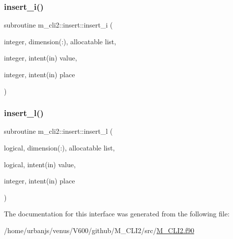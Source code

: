 \subsubsection{\texorpdfstring{insert\+\_\+i()}{insert\_i()}}
{\footnotesize\ttfamily subroutine m\+\_\+cli2\+::insert\+::insert\+\_\+i (\begin{DoxyParamCaption}\item[{integer, dimension(\+:), allocatable}]{list,  }\item[{integer, intent(in)}]{value,  }\item[{integer, intent(in)}]{place }\end{DoxyParamCaption})\hspace{0.3cm}{\ttfamily [private]}}

\mbox{\label{interfacem__cli2_1_1insert_a48dedb7035fb157485c81de9fc245659}} 
\subsubsection{\texorpdfstring{insert\+\_\+l()}{insert\_l()}}
{\footnotesize\ttfamily subroutine m\+\_\+cli2\+::insert\+::insert\+\_\+l (\begin{DoxyParamCaption}\item[{logical, dimension(\+:), allocatable}]{list,  }\item[{logical, intent(in)}]{value,  }\item[{integer, intent(in)}]{place }\end{DoxyParamCaption})\hspace{0.3cm}{\ttfamily [private]}}



The documentation for this interface was generated from the following file\+:\begin{DoxyCompactItemize}
\item 
/home/urbanjs/venus/\+V600/github/\+M\+\_\+\+C\+L\+I2/src/\mbox{\hyperlink{M__CLI2_8f90}{M\+\_\+\+C\+L\+I2.\+f90}}\end{DoxyCompactItemize}
